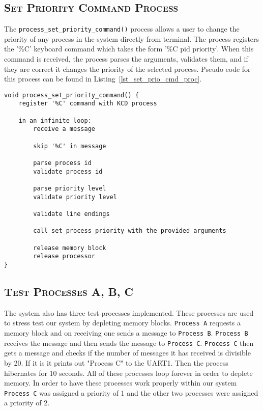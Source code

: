 \documentclass[oneside]{report}
\begin{document}
\subsection{\textsc{Set Priority Command Process}}

The \texttt{process\_set\_priority\_command()} process allows a user
to change the priority of any process in the system directly from
terminal. The process registers the '\%C' keyboard command which takes
the form '\%C pid priority'. When this command is received, the
process parses the arguments, validates them, and if they are correct
it changes the priority of the selected process. Pseudo code for this
process can be found in Listing~\ref{lst_set_prio_cmd_proc}.


\begin{lstlisting}
void process_set_priority_command() {
    register '%C' command with KCD process
    
    in an infinite loop:
        receive a message

        skip '%C' in message

        parse process id
        validate process id

        parse priority level
        validate priority level

        validate line endings
        
        call set_process_priority with the provided arguments

        release memory block
        release processor
}
\end{lstlisting}

\subsection{\textsc{Test Processes A, B, C}}
The system also has three test processes implemented. These processes are used
to stress test our system by depleting memory blocks. \texttt{Process A}
requests a memory block and on receiving one sends a message to \texttt{Process
B}. \texttt{Process B} receives the message and then sends the message to
\texttt{Process C}. \texttt{Process C} then gets a message and checks if the
number of messages it has received is divisible by 20. If it is it prints out
"Process C" to the UART1. Then the process hibernates for 10 seconds. All of
these processes loop forever in order to deplete memory. In order to have these
processes work properly within our system \texttt{Process C} was assigned a
priority of 1 and the other two processes were assigned a priority of 2.
\end{document}
